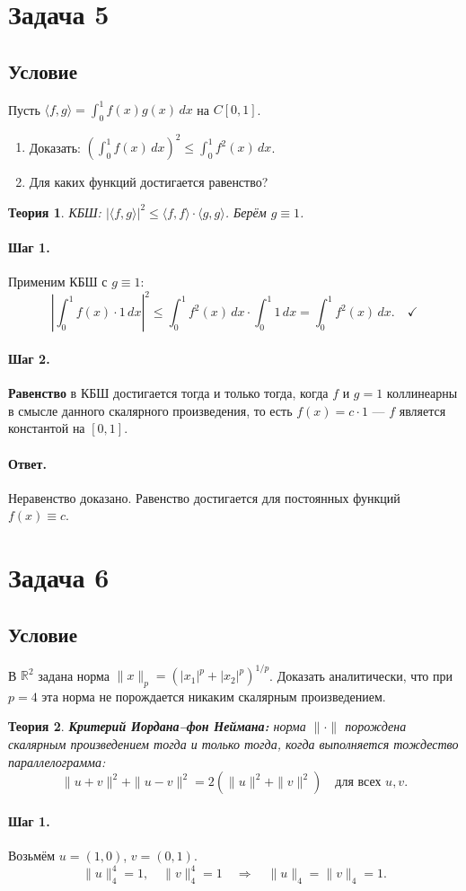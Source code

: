 \documentclass[12pt,a4paper]{article}
\theoremstyle{solution}
\newtheorem*{theory}{Теория}
\newcommand{\task}[1]{\newpage\section*{Задача #1}}
\newcommand{\answer}{\paragraph{Ответ.}}
\newcommand{\step}[1]{\paragraph{Шаг #1.}}
\newcommand{\R}{\mathbb{R}}
\begin{document}
\task{5}
\subsection*{Условие}
Пусть $\langle f,g\rangle=\int_0^1 f(x)g(x)\,dx$ на $C[0,1]$.
\begin{enumerate}
\item Доказать: $\displaystyle\left(\int_0^1 f(x)\,dx\right)^2\leq\int_0^1 f^2(x)\,dx$.
\item Для каких функций достигается равенство?
\end{enumerate}

\begin{theory}
КБШ: $|\langle f,g\rangle|^2\leq\langle f,f\rangle\cdot\langle g,g\rangle$. Берём $g\equiv 1$.
\end{theory}

\step{1} Применим КБШ с $g\equiv 1$:
\[
\left|\int_0^1 f(x)\cdot 1\,dx\right|^2\leq\int_0^1 f^2(x)\,dx\cdot\int_0^1 1\,dx
=\int_0^1 f^2(x)\,dx.\quad\checkmark
\]

\step{2} \textbf{Равенство} в КБШ достигается тогда и только тогда, когда $f$ и $g=1$ коллинеарны в смысле данного скалярного произведения, то есть $f(x)=c\cdot 1$ --- $f$ является константой на $[0,1]$.

\answer Неравенство доказано. Равенство достигается для постоянных функций $f(x)\equiv c$.

\task{6}
\subsection*{Условие}
В $\R^2$ задана норма $\|x\|_p=(|x_1|^p+|x_2|^p)^{1/p}$. Доказать аналитически, что при $p=4$ эта норма не порождается никаким скалярным произведением.

\begin{theory}
\textbf{Критерий Иордана--фон Неймана:} норма $\|\cdot\|$ порождена скалярным произведением тогда и только тогда, когда выполняется тождество параллелограмма:
\[
\|u+v\|^2+\|u-v\|^2=2(\|u\|^2+\|v\|^2)\quad\text{для всех }u,v.
\]
\end{theory}

\step{1} Возьмём $u=(1,0)$, $v=(0,1)$.
\[
\|u\|_4^4=1,\quad\|v\|_4^4=1\quad\Rightarrow\quad\|u\|_4=\|v\|_4=1.
\]
\end{document}
